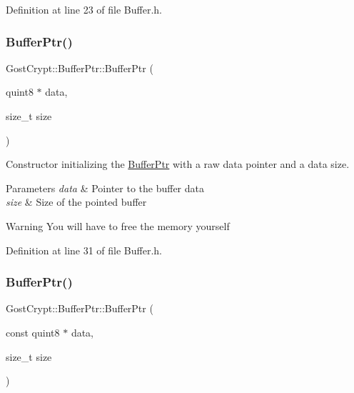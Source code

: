 Definition at line 23 of file Buffer.\+h.

\mbox{\label{class_gost_crypt_1_1_buffer_ptr_a519a1bcf230de077c8bbc1adb3b586b4}} 
\subsubsection{\texorpdfstring{Buffer\+Ptr()}{BufferPtr()}\hspace{0.1cm}{\footnotesize\ttfamily [2/3]}}
{\footnotesize\ttfamily Gost\+Crypt\+::\+Buffer\+Ptr\+::\+Buffer\+Ptr (\begin{DoxyParamCaption}\item[{quint8 $\ast$}]{data,  }\item[{size\+\_\+t}]{size }\end{DoxyParamCaption})\hspace{0.3cm}{\ttfamily [inline]}}



Constructor initializing the \hyperlink{class_gost_crypt_1_1_buffer_ptr}{Buffer\+Ptr} with a raw data pointer and a data size. 


\begin{DoxyParams}{Parameters}
{\em data} & Pointer to the buffer data \\
\hline
{\em size} & Size of the pointed buffer \\
\hline
\end{DoxyParams}
\begin{DoxyWarning}{Warning}
You will have to free the memory yourself 
\end{DoxyWarning}


Definition at line 31 of file Buffer.\+h.

\mbox{\label{class_gost_crypt_1_1_buffer_ptr_ae68f62b21df95bcca8ef7adbaf6efb16}} 
\subsubsection{\texorpdfstring{Buffer\+Ptr()}{BufferPtr()}\hspace{0.1cm}{\footnotesize\ttfamily [3/3]}}
{\footnotesize\ttfamily Gost\+Crypt\+::\+Buffer\+Ptr\+::\+Buffer\+Ptr (\begin{DoxyParamCaption}\item[{const quint8 $\ast$}]{data,  }\item[{size\+\_\+t}]{size }\end{DoxyParamCaption})\hspace{0.3cm}{\ttfamily [inline]}}



